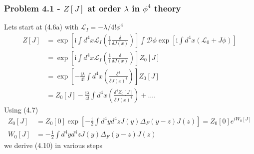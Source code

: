 \documentclass[10pt,a4paper]{book}
\theoremstyle{definition}
\begin{document}
\subsubsection{Problem 4.1 - \texorpdfstring{$Z[J]$}{Lg} at order \texorpdfstring{$\lambda$}{Lg} in \texorpdfstring{$\phi^4$}{Lg} theory}
Lets start at (4.6a) with $\mathscr{L}_I=-\lambda/4!\phi^4$
\begin{align}
    Z[J]&=\exp\left[\text{i}\int d^4x\mathscr{L}_I\left(\frac{1}{\text{i}}\frac{\delta}{\delta J(x)}\right)\right]\int\mathcal{D}\phi\exp\left[\text{i}\int d^4x(\mathscr{L}_0+J\phi)\right]\\
    &=\exp\left[\text{i}\int d^4x\mathscr{L}_I\left(\frac{1}{\text{i}}\frac{\delta}{\delta J(x)}\right)\right]Z_0[J]\\
    &=\exp\left[-\frac{\text{i}\lambda}{4!}\int d^4x\left(\frac{\delta^4 }{\delta J(x)^4}\right)\right]Z_0[J]\\
    &=Z_0[J]-\frac{\text{i}\lambda}{4!}\int d^4x\left(\frac{\delta^4 Z_0[J]}{\delta J(x)^4}\right)+\dots.
\end{align}
Using (4.7)
\begin{align}
    Z_0[J]&=Z_0[0]\exp\left[-\frac{\text{i}}{2}\int d^4yd^4zJ(y)\Delta_F(y-z)J(z)\right]=Z_0[0]e^{iW_0[J]}\\
    W_0[J]&=-\frac{1}{2}\int d^4yd^4zJ(y)\Delta_F(y-z)J(z)
\end{align}
we derive (4.10) in various steps 
\end{document}
